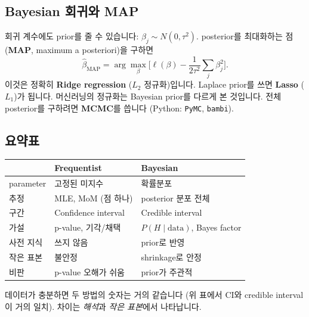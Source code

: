 \documentclass[11pt,a4paper]{article}
\newcommand{\term}[1]{\textbf{#1}}
\newcommand{\code}[1]{\texttt{#1}}
\begin{document}
\subsection{Bayesian 회귀와 MAP}
회귀 계수에도 prior를 줄 수 있습니다: $\beta_j\sim N(0,\tau^2)$. posterior를 최대화하는 점 (\term{MAP}, maximum a posteriori)을 구하면
\[
\hat\beta_{\text{MAP}}=\arg\max_\beta\Big[\ell(\beta)-\frac1{2\tau^2}\sum_j\beta_j^2\Big].
\]
이것은 정확히 \term{Ridge regression} ($L_2$ 정규화)입니다. Laplace prior를 쓰면 \term{Lasso} ($L_1$)가 됩니다. 머신러닝의 정규화는 Bayesian prior를 다르게 본 것입니다. 전체 posterior를 구하려면 \term{MCMC}를 씁니다 (Python: \code{PyMC}, \code{bambi}).

\subsection{요약표}
\begin{center}
\begin{tabular}{@{}p{3.4cm} p{5.5cm} p{5.5cm}@{}}
\toprule
 & Frequentist & Bayesian \\
\midrule
parameter & 고정된 미지수 & 확률분포 \\
추정 & MLE, MoM (점 하나) & posterior 분포 전체 \\
구간 & Confidence interval & Credible interval \\
가설 & p-value, 기각/채택 & $P(H\mid\text{data})$, Bayes factor \\
사전 지식 & 쓰지 않음 & prior로 반영 \\
작은 표본 & 불안정 & shrinkage로 안정 \\
비판 & p-value 오해가 쉬움 & prior가 주관적 \\
\bottomrule
\end{tabular}
\end{center}
데이터가 충분하면 두 방법의 숫자는 거의 같습니다 (위 표에서 CI와 credible interval이 거의 일치). 차이는 \emph{해석}과 \emph{작은 표본}에서 나타납니다.
\end{document}
